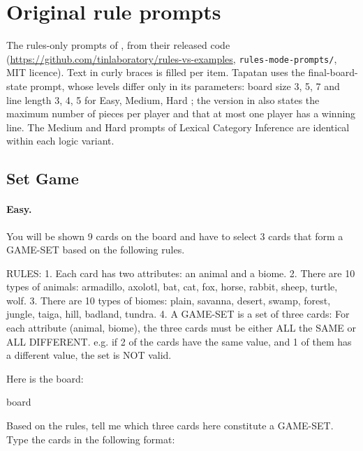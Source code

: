
\section{Original rule prompts}\label{app:orig}
The rules-only prompts of \citet{fu2026rules}, from their released code (\url{https://github.com/tinlaboratory/rules-vs-examples}, \texttt{rules-mode-prompts/}, MIT licence). Text in curly braces is filled per item. Tapatan uses the final-board-state prompt, whose levels differ only in its parameters: board size 3, 5, 7 and line length 3, 4, 5 for Easy, Medium, Hard \citep[Table~1]{fu2026rules}; the version in \citet[App.~F]{fu2026rules} also states the maximum number of pieces per player and that at most one player has a winning line. The Medium and Hard prompts of Lexical Category Inference are identical within each logic variant.

\subsection*{Set Game}

\paragraph{Easy.}
\begin{promptbox}
You will be shown 9 cards on the board and have to select 3 cards that form a GAME-SET based on the following rules.

RULES:
1. Each card has two attributes: an animal and a biome.
2. There are 10 types of animals: armadillo, axolotl, bat, cat, fox, horse, rabbit, sheep, turtle, wolf.
3. There are 10 types of biomes: plain, savanna, desert, swamp, forest, jungle, taiga, hill, badland, tundra.
4. A GAME-SET is a set of three cards: For each attribute (animal, biome), the three cards must be either ALL the SAME or ALL DIFFERENT. e.g. if 2 of the cards have the same value, and 1 of them has a different value, the set is NOT valid.

Here is the board:

{board}

Based on the rules, tell me which three cards here constitute a GAME-SET. Type the cards in the following format:
\end{promptbox}

